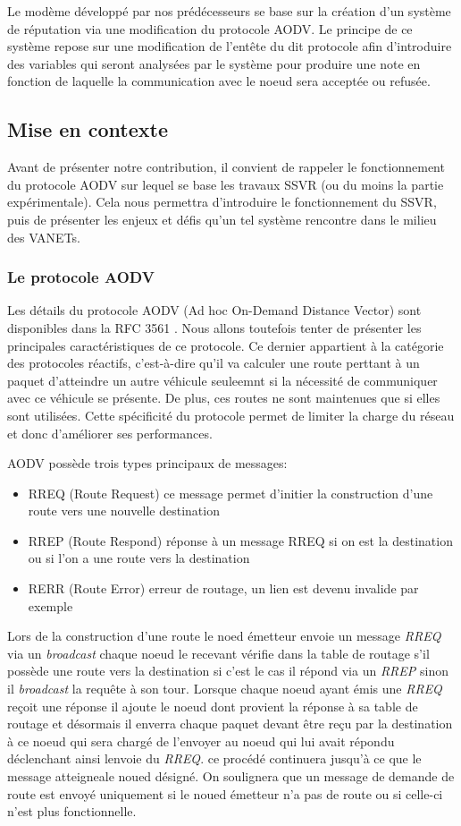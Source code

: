 Le modème développé par nos prédécesseurs se base sur la création d'un système de réputation via une modification du protocole
AODV. Le principe de ce système repose sur une modification de l'entête du dit protocole afin d'introduire des variables qui
seront analysées par le système pour produire une note en fonction de laquelle la communication avec le noeud sera acceptée ou
refusée.

\subsection{Mise en contexte}
Avant de présenter notre contribution, il convient de rappeler le fonctionnement du protocole AODV sur lequel se base les travaux
SSVR (ou du moins la partie expérimentale). Cela nous permettra d'introduire le fonctionnement du SSVR, puis de présenter les
enjeux et défis qu'un tel système rencontre dans le milieu des VANETs.

\subsubsection{Le protocole AODV}
Les détails du protocole AODV (Ad hoc On-Demand Distance Vector) sont disponibles dans la RFC 3561 \cite{rfcAODV}. Nous allons
toutefois tenter de présenter les principales caractéristiques de ce protocole. Ce dernier appartient à la catégorie des
protocoles réactifs, c'est-à-dire qu'il va calculer une route perttant à un paquet d'atteindre un autre véhicule seuleemnt si la
nécessité de communiquer avec ce véhicule se présente. De plus, ces routes ne sont maintenues que si elles sont utilisées. Cette
spécificité du protocole permet de limiter la charge du réseau et donc d'améliorer ses performances.

AODV possède trois types principaux de messages:
\begin{itemize}
    \item RREQ (Route Request) ce message permet d'initier la construction d'une route vers une nouvelle destination
    \item RREP  (Route Respond) réponse à un message RREQ si on est la destination ou si l'on a une route vers la destination
    \item RERR  (Route Error) erreur de routage, un lien est devenu invalide par exemple
\end{itemize}
Lors de la construction d'une route le noed émetteur envoie un message \textit{RREQ} via un \textit{broadcast} chaque noeud le
recevant vérifie dans la table de routage s'il possède une route vers la destination si c'est le cas il répond via un
\textit{RREP} sinon il \textit{broadcast} la requête à son tour. Lorsque chaque noeud ayant émis une \textit{RREQ} reçoit une
réponse il ajoute le noeud dont provient la réponse à sa table de routage et désormais il enverra chaque paquet devant être reçu
par la destination à ce noeud qui sera chargé de l'envoyer au noeud qui lui avait répondu déclenchant ainsi lenvoie du
\textit{RREQ}. ce procédé continuera jusqu'à ce que le message atteigneale noued désigné. On soulignera que un message de demande
de route est envoyé uniquement si le noued émetteur n'a pas de route ou si celle-ci n'est plus fonctionnelle.

